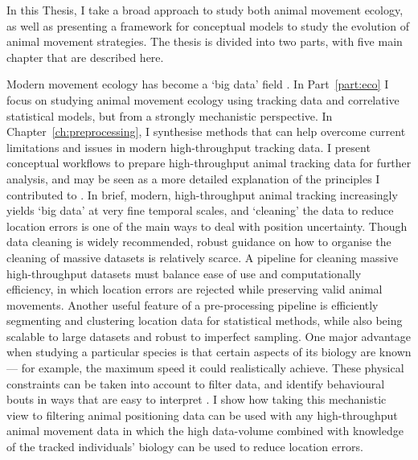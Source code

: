 In this Thesis, I take a broad approach to study both animal movement ecology, as well as presenting a framework for conceptual models to study the evolution of animal movement strategies. The thesis is divided into two parts, with five main chapter that are described here.

\medskip

Modern movement ecology has become a `big data' field \parencite{nathan2022}.
In Part~\ref{part:eco} I focus on studying animal movement ecology using tracking data and correlative statistical models, but from a strongly mechanistic perspective.
In Chapter~\ref{ch:preprocessing}, I synthesise methods that can help overcome current limitations and issues in modern high-throughput tracking data.
I present conceptual workflows to prepare high-throughput animal tracking data for further analysis, and may be seen as a more detailed explanation of the principles I contributed to \textcite{nathan2022}.
In brief, modern, high-throughput animal tracking increasingly yields `big data' at very fine temporal scales, and `cleaning' the data to reduce location errors is one of the main ways to deal with position uncertainty.
Though data cleaning is widely recommended, robust guidance on how to organise the cleaning of massive datasets is relatively scarce.
A pipeline for cleaning massive high-throughput datasets must balance ease of use and computationally efficiency, in which location errors are rejected while preserving valid animal movements. 
Another useful feature of a pre-processing pipeline is efficiently segmenting and clustering location data for statistical methods, while also being scalable to large datasets and robust to imperfect sampling.
One major advantage when studying a particular species is that certain aspects of its biology are known --- for example, the maximum speed it could realistically achieve.
These physical constraints can be taken into account to filter data, and identify behavioural bouts in ways that are easy to interpret \parencite[][]{barraquand2008}.
I show how taking this mechanistic view to filtering animal positioning data can be used with any high-throughput animal movement data in which the high data-volume combined with knowledge of the tracked individuals' biology can be used to reduce location errors.

